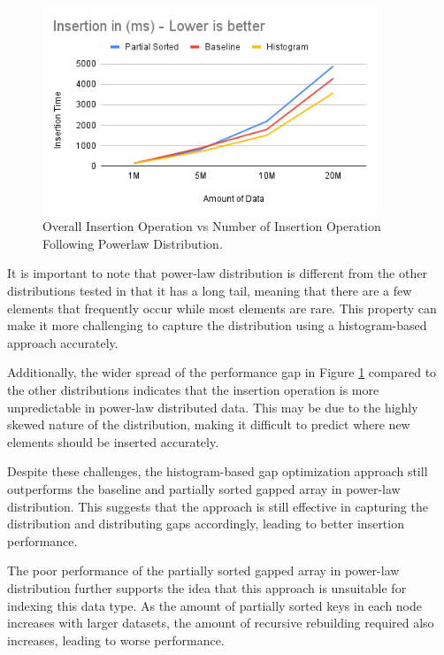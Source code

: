 \begin{figure}[H]
    \centering
    \includegraphics[width=100mm,scale=1]{Figures/InsertionResultPowerlaw.png}
    \caption{
    Overall Insertion Operation vs Number of Insertion Operation Following Powerlaw Distribution.
    }
    \label{fig:GraphInsertionResultPowerlaw}
\end{figure}
It is important to note that power-law distribution is different from the other distributions tested in that it has a long tail, meaning that there are a few elements that frequently occur while most elements are rare. This property can make it more challenging to capture the distribution using a histogram-based approach accurately.

Additionally, the wider spread of the performance gap in Figure \ref{fig:GraphInsertionResultPowerlaw} compared to the other distributions indicates that the insertion operation is more unpredictable in power-law distributed data. This may be due to the highly skewed nature of the distribution, making it difficult to predict where new elements should be inserted accurately.

Despite these challenges, the histogram-based gap optimization approach still outperforms the baseline and partially sorted gapped array in power-law distribution. This suggests that the approach is still effective in capturing the distribution and distributing gaps accordingly, leading to better insertion performance.

The poor performance of the partially sorted gapped array in power-law distribution further supports the idea that this approach is unsuitable for indexing this data type. As the amount of partially sorted keys in each node increases with larger datasets, the amount of recursive rebuilding required also increases, leading to worse performance.


